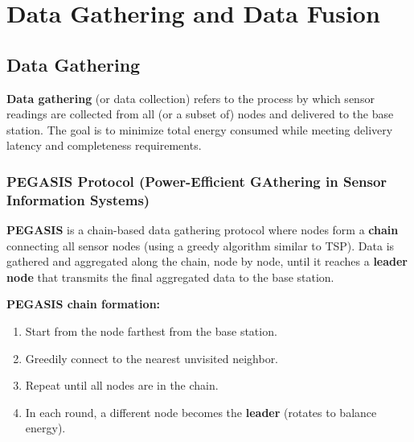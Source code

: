 \documentclass[12pt,a4paper]{article}
\begin{document}
\section{Data Gathering and Data Fusion}

\subsection{Data Gathering}

\begin{tcolorbox}[defbox, title={\textbf{Data Gathering --- Definition}}]
\textbf{Data gathering} (or data collection) refers to the process by which sensor readings are collected from all (or a subset of) nodes and delivered to the base station. The goal is to minimize total energy consumed while meeting delivery latency and completeness requirements.
\end{tcolorbox}

\subsubsection*{PEGASIS Protocol (Power-Efficient GAthering in Sensor Information Systems)}

\begin{tcolorbox}[defbox, title={\textbf{PEGASIS --- Definition}}]
\textbf{PEGASIS} is a chain-based data gathering protocol where nodes form a \textbf{chain} connecting all sensor nodes (using a greedy algorithm similar to TSP). Data is gathered and aggregated along the chain, node by node, until it reaches a \textbf{leader node} that transmits the final aggregated data to the base station.
\end{tcolorbox}

\textbf{PEGASIS chain formation:}
\begin{enumerate}[leftmargin=*, itemsep=3pt]
  \item Start from the node farthest from the base station.
  \item Greedily connect to the nearest unvisited neighbor.
  \item Repeat until all nodes are in the chain.
  \item In each round, a different node becomes the \textbf{leader} (rotates to balance energy).
\end{enumerate}
\end{document}
